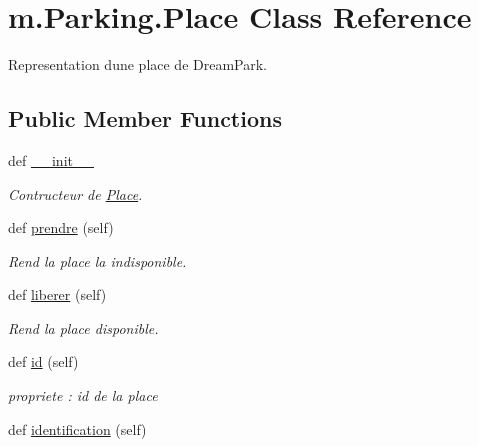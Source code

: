 \hypertarget{classm_1_1_parking_1_1_place}{}\section{m.\+Parking.\+Place Class Reference}
\label{classm_1_1_parking_1_1_place}


Representation d\textquotesingle{}une place de Dream\+Park.  


\subsection*{Public Member Functions}
\begin{DoxyCompactItemize}
\item 
def \hyperlink{classm_1_1_parking_1_1_place_ab779933067355ffdc888f138b7f55316}{\+\_\+\+\_\+init\+\_\+\+\_\+}
\begin{DoxyCompactList}\small\item\em Contructeur de \hyperlink{classm_1_1_parking_1_1_place}{Place}. \end{DoxyCompactList}\item 
\hypertarget{classm_1_1_parking_1_1_place_a5a66939a24acbb1a95dc96e2c9290493}{}def \hyperlink{classm_1_1_parking_1_1_place_a5a66939a24acbb1a95dc96e2c9290493}{prendre} (self)\label{classm_1_1_parking_1_1_place_a5a66939a24acbb1a95dc96e2c9290493}

\begin{DoxyCompactList}\small\item\em Rend la place la indisponible. \end{DoxyCompactList}\item 
\hypertarget{classm_1_1_parking_1_1_place_ad9ffeed25e426e7adc628e17250d40ad}{}def \hyperlink{classm_1_1_parking_1_1_place_ad9ffeed25e426e7adc628e17250d40ad}{liberer} (self)\label{classm_1_1_parking_1_1_place_ad9ffeed25e426e7adc628e17250d40ad}

\begin{DoxyCompactList}\small\item\em Rend la place disponible. \end{DoxyCompactList}\item 
\hypertarget{classm_1_1_parking_1_1_place_a88d81921759be348966d8d7a298d45c7}{}def \hyperlink{classm_1_1_parking_1_1_place_a88d81921759be348966d8d7a298d45c7}{id} (self)\label{classm_1_1_parking_1_1_place_a88d81921759be348966d8d7a298d45c7}

\begin{DoxyCompactList}\small\item\em propriete \+: id de la place \end{DoxyCompactList}\item 
\hypertarget{classm_1_1_parking_1_1_place_a2b91ce6182d9bc0553892e7fbf7eb7ff}{}def \hyperlink{classm_1_1_parking_1_1_place_a2b91ce6182d9bc0553892e7fbf7eb7ff}{identification} (self)\label{classm_1_1_parking_1_1_place_a2b91ce6182d9bc0553892e7fbf7eb7ff}


\end{DoxyCompactItemize}
